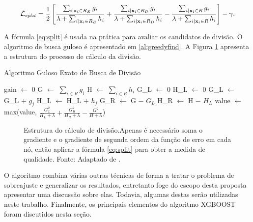 \begin{equation}\label{eq:split}
\mathcal{\tilde{L}}_{split}=\frac{1}{2}\left[\frac{\sum_{i|{\bf x}_i\in R_E}g_i}{\lambda+\sum_{i|{\bf x}_i\in R_E}h_i}+\frac{\sum_{i|{\bf x}_i\in R_D}g_i}{\lambda+\sum_{i|{\bf x}_i\in R_D}h_i}-\frac{\sum_{i|{\bf x}_i\in R}g_i}{\lambda+\sum_{i|{\bf x}_i\in R}h_i}\right]-\gamma\mbox{.}
\end{equation}

A fórmula \eqref{eq:split} é usada na prática para avaliar os candidatos de divisão. O algoritmo de busca guloso é apresentado em \ref{al:greedyfind}. A Figura \ref{fig:structscore} apresenta a estrutura do processo de cálculo da divisão.

\begin{algorithm}
\caption{Algoritmo Guloso Exato de Busca de Divisão}\label{al:greedyfind}
\begin{algorithmic}[1]

\State gain $\gets$ 0
\State G $\gets$ $\sum_{i\in R}g_i$
\State H $\gets$ $\sum_{i\in R}h_i$
    \State G\_L $\gets$ 0
    \State H\_L $\gets$ 0
        \State G\_L $\gets$ G\_L $+$ $g_j$
        \State H\_L $\gets$ H\_L $+$ $h_j$
        \State G\_R $\gets$ G $-$ $G_L$
        \State H\_R $\gets$ H $-$ $H_L$
        \State value $\gets$ max(value, $\frac{G_L^2}{H_L+\lambda}+\frac{G_R^2}{H_R+\lambda}-\frac{G^2}{H+\lambda}$)
    \EndFor
\EndFor
\end{algorithmic}
\end{algorithm}

\begin{figure}[H]
\centering
{}
\caption{Estrutura do cálculo de divisão.Apenas é necessário soma o gradiente e o gradiente de segunda ordem da função de erro em cada nó, então aplicar a fórmula \eqref{eq:split} para obter a medida de qualidade. Fonte: Adaptado de \cite{CHEN:2016}.}
\label{fig:structscore}
\end{figure}

O algoritmo combina várias outras técnicas de forma a tratar o problema de sobreajuste e generalizar os resultados, entretanto foge do escopo desta proposta apresentar uma discussão sobre elas. Todavia, algumas destas serão utilizadas neste trabalho. Finalmente, os principais elementos do algoritmo XGBOOST foram discutidos nesta seção.
